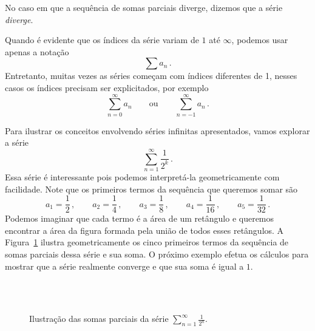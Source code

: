 No caso em que a sequência de somas parciais diverge, dizemos que a série \emph{diverge}.

Quando é evidente que os índices da série variam de $1$ até $\infty$,
podemos usar apenas a notação 
\[
  \sum a_n   \,.
\]
Entretanto, muitas vezes as séries começam com índices diferentes de 1,
nesses casos os índices precisam ser explicitados, por exemplo
\[
  \sum_{n= 0}^\infty a_n   \qquad \text{ou} \qquad
  \sum_{n=-1}^\infty a_n   \,.
\]


Para ilustrar os conceitos envolvendo séries infinitas apresentados,
vamos explorar a série
\[
  \sum_{n=1}^{\infty} \frac{1}{2^k}  \,.
\]
Essa série é interessante pois podemos interpretá-la
geometricamente com facilidade.
Note que os primeiros termos da sequência que queremos somar são
\[
  a_1 = \frac{1}{2}   \,,\qquad
  a_2 = \frac{1}{4}   \,,\qquad
  a_3 = \frac{1}{8}   \,,\qquad
  a_4 = \frac{1}{16}  \,,\qquad
  a_5 = \frac{1}{32}  \,.
\]
Podemos imaginar que cada termo é a área de um retângulo e queremos
encontrar a área da figura formada pela união de todos esses retângulos.
A Figura~\ref{fig:soma-1div2n} ilustra geometricamente os cinco primeiros
termos da sequência de somas parciais dessa série e sua soma. O próximo exemplo
efetua os cálculos para mostrar que a série realmente converge e que
sua soma é igual a $1$.

\begin{figure}
	\centering
  
	
	 \\
	
	
	   \\
	\caption{Ilustração das somas parciais da série \(\sum_{n=1}^\infty\frac{1}{2^n}\).}
	\label{fig:soma-1div2n}
\end{figure}

